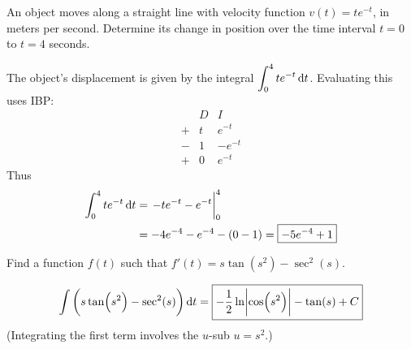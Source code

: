 \documentclass[12pt,answers]{exam}
\begin{document}
\begin{questions}

\newpage
\question[10]
An object moves along a straight line with velocity function $v(t) = t e^{-t}$, in meters per second. Determine its change in position over the time interval $t = 0$ to $t = 4$ seconds.
\begin{solution}
	The object's displacement is given by the integral $\displaystyle \int_0^4 t e^{-t} \dif t$.
	Evaluating this uses IBP:
	\[
		\begin{array}{ccc}
			  & D & I       \\
			+ & t & e^{-t}  \\
			- & 1 & -e^{-t} \\
			+ & 0 & e^{-t}
		\end{array}
	\]
	Thus
	\begin{align*}
		\int_0^4 t e^{-t} \dif t
		 & = \eval{-te^{-t} - e^{-t}}_0^4 \\
		 & = -4 e^{-4} - e^{-4} - (0-1)
		= \boxed{-5e^{-4} + 1}
	\end{align*}
\end{solution}

\question[10]
Find a function $f(t)$ such that $f'(t) = s \tan(s^2) - \sec^2(s)$.
\begin{solution}
	\begin{align*}
		\int \left( s \tan(s^2) - \sec^2(s) \right)\dif t
		= \boxed{-\frac12 \ln\abs{\cos(s^2)} - \tan(s) + C}
	\end{align*}
	(Integrating the first term involves the $u$-sub $u = s^2$.)
\end{solution}
\end{questions}
\end{document}
